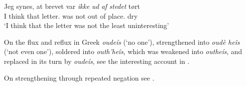 \ea \label{ex:02-47}
\gll Jeg synes, at brevet var \textit{ikke} \textit{ud} \textit{af} \textit{stedet} tørt\\
 I think that letter.\DEF{} was not out of place.\DEF{} dry\\
\glt `I think that the letter was not the least uninteresting'
\z
{}

On the flux and reflux in Greek \textit{oudeís} (`no one'), strengthened into \textit{oudè heîs} (`not even one'), soldered into \textit{outh'heîs}, which was weakened into \textit{outheís}, and replaced in its turn by \textit{oudeís}, see the interesting account in \citet[\href{https://archive.org/details/aperudunehisto00meil/page/198/mode/2up?q=n\%C3\%A9gation&view=theater}{290f}]{meillet1920aperu}. %

On strengthening through repeated negation see .
